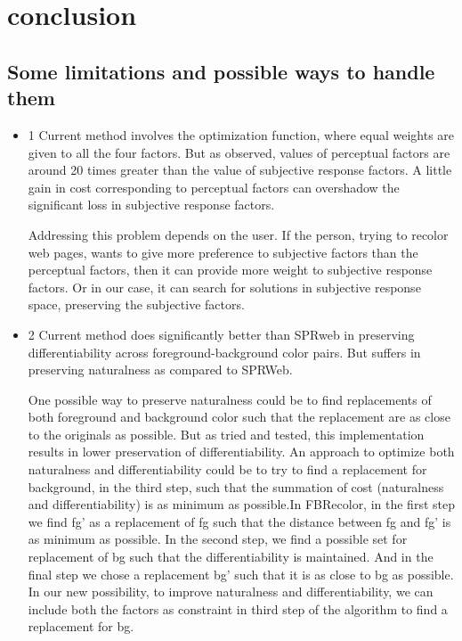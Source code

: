 \chapter{conclusion}
\thispagestyle{plain}

\label{Conclusion and future work}

\section{Some limitations and possible ways to handle them}
\label{limitations}


\begin{itemize}
\item{1} Current method involves the optimization function, where equal weights are given to all the four factors. But as observed, values of perceptual factors are around 20 times greater than the value of subjective response factors. A little gain in cost corresponding to perceptual factors can overshadow the significant loss in subjective response factors.


Addressing this problem depends on the user. If the person, trying to recolor web pages, wants to give more preference to subjective factors than the perceptual factors, then it can provide more weight to subjective response factors. Or in our case, it can search for solutions in subjective response space, preserving the subjective factors. 

\item{2} Current method does significantly better than SPRweb in preserving differentiability across foreground-background color pairs. But suffers in preserving naturalness as compared to SPRWeb.  


One possible way to preserve naturalness could be to find replacements of both foreground and background color such that the replacement are as close to the originals as possible. But as tried and tested, this implementation results in lower preservation of differentiability. An approach to optimize both naturalness and differentiability could be to try to find a replacement for background, in the third step, such that the summation of cost (naturalness and differentiability) is as minimum as possible.In FBRecolor, in the first step we find fg’ as a replacement of fg such that the distance between fg and fg’ is as minimum as possible. In the second step, we find a possible set for replacement of bg such that the differentiability is maintained. And in the final step we chose a replacement bg’ such that it is as close to bg as possible. In our new possibility, to improve naturalness and differentiability, we can include both the factors as constraint in third step of the algorithm to find a replacement for bg.



\end{itemize}
